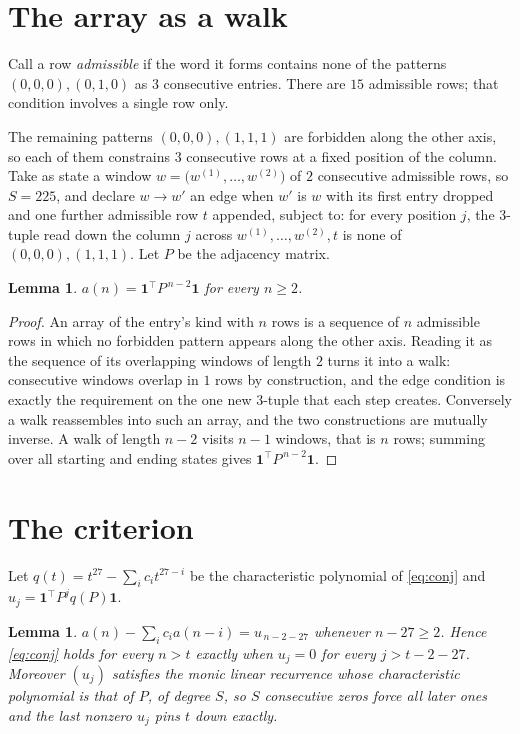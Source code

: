 \documentclass[11pt,a4paper]{article}
\theoremstyle{plain}
\newtheorem{lemma}[theorem]{Lemma}
\theoremstyle{definition}
\begin{document}
\section{The array as a walk}

Call a row \emph{admissible} if the word it forms contains none of the patterns
$(0,0,0), (0,1,0)$ as $3$ consecutive entries. There are $15$ admissible rows; that condition
involves a single row only.

The remaining patterns $(0,0,0), (1,1,1)$ are forbidden along the other axis, so each of them
constrains $3$ consecutive rows at a fixed position of the column. Take as state a
window $w=\bigl(w^{(1)},\dots,w^{(2)}\bigr)$ of $2$ consecutive admissible
rows, so $S=225$, and declare $w\to w'$ an edge when $w'$ is $w$ with its first entry
dropped and one further admissible row $t$ appended, subject to: for every position
$j$, the $3$-tuple read down the column $j$ across $w^{(1)},\dots,w^{(2)},t$
is none of $(0,0,0), (1,1,1)$. Let $P$ be the adjacency matrix.

\begin{lemma}\label{lem:walk}
$a(n)=\mathbf{1}^{\!\top}P^{\,n-2}\mathbf{1}$ for every $n\ge2$.
\end{lemma}

\begin{proof}
An array of the entry's kind with $n$ rows is a sequence of $n$ admissible rows in
which no forbidden pattern appears along the other axis. Reading it as the sequence of its
overlapping windows of length $2$ turns it into a walk: consecutive windows overlap in
$1$ rows by construction, and the edge condition is exactly the requirement on the one
new $3$-tuple that each step creates. Conversely a walk reassembles into such an array,
and the two constructions are mutually inverse. A walk of length $n-2$ visits $n-1$
windows, that is $n$ rows; summing over all starting and ending states gives
$\mathbf{1}^{\!\top}P^{\,n-2}\mathbf{1}$.
\end{proof}

\section{The criterion}

Let $q(t)=t^{27}-\sum_i c_i t^{27-i}$ be the characteristic polynomial of
\eqref{eq:conj} and $u_j=\mathbf{1}^{\!\top}P^{j}q(P)\mathbf{1}$.

\begin{lemma}\label{lem:crit}
$a(n)-\sum_i c_i a(n-i)=u_{\,n-2-27}$ whenever $n-27\ge2$. Hence
\eqref{eq:conj} holds for every $n>t$ exactly when $u_j=0$ for every
$j>t-2-27$. Moreover $(u_j)$ satisfies the monic linear recurrence whose
characteristic polynomial is that of $P$, of degree $S$, so $S$ consecutive zeros force all
later ones and the last nonzero $u_j$ pins $t$ down exactly.
\end{lemma}
\end{document}
